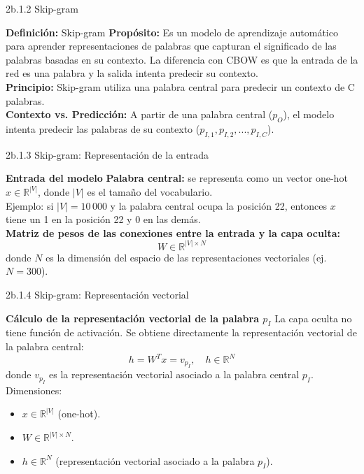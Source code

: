 \documentclass{beamer}
\begin{document}
\begin{frame}[fragile]{2b.1.2 Skip-gram}
	\begin{block}{\textbf{Definición:} Skip-gram}
		\justifying
		\vspace{0.1cm}
		\textbf{Propósito:} Es un modelo de aprendizaje automático para aprender representaciones de palabras que capturan el significado de las palabras basadas en su contexto. La diferencia con CBOW es que la entrada de la red es una palabra y la salida intenta predecir su contexto.\\
		\vspace{0.1cm}
		\textbf{Principio:} Skip-gram utiliza una palabra central para predecir un contexto de C palabras.\\
		\vspace{0.1cm}
		\textbf{Contexto vs. Predicción:} A partir de una palabra central ($p_O$), el modelo intenta predecir las palabras de su contexto ($p_{I,1}, p_{I,2}, ..., p_{I,C}$).
	\end{block}    
\end{frame}

\begin{frame}[fragile]{2b.1.3 Skip-gram: Representación de la entrada}
	\begin{block}{\textbf{Entrada del modelo}}
		\justifying
		\textbf{Palabra central:} se representa como un vector one-hot $x \in \mathbb{R}^{|V|}$, 
		donde $|V|$ es el tamaño del vocabulario.\\
		\vspace{0.2cm}
		Ejemplo: si $|V|=10\,000$ y la palabra central ocupa la posición 22, 
		entonces $x$ tiene un 1 en la posición 22 y 0 en las demás.\\
		\vspace{0.2cm}
		\textbf{Matriz de pesos de las conexiones entre la entrada y la capa oculta:} 
		\[
		W \in \mathbb{R}^{|V| \times N}
		\]
		donde $N$ es la dimensión del espacio de las representaciones vectoriales (ej. $N=300$).
	\end{block}
\end{frame}

\begin{frame}[fragile]{2b.1.4 Skip-gram: Representación vectorial}
	\begin{block}{\textbf{Cálculo de la representación vectorial de la palabra $p_I$}}
		\justifying
		La capa oculta no tiene función de activación. 
		Se obtiene directamente la representación vectorial de la palabra central:
		\[
		h = W^T x = v_{p_I}, \quad h \in \mathbb{R}^N
		\]
		donde $v_{p_I}$ es la representación vectorial asociado a la palabra central $p_I$.\\
		\vspace{0.2cm}
		Dimensiones:
		\begin{itemize}
			\item $x \in \mathbb{R}^{|V|}$ (one-hot).
			\item $W \in \mathbb{R}^{|V| \times N}$.
			\item $h \in \mathbb{R}^N$ (representación vectorial asociado a la palabra $p_I$).
		\end{itemize}
	\end{block}
\end{frame}
\end{document}
